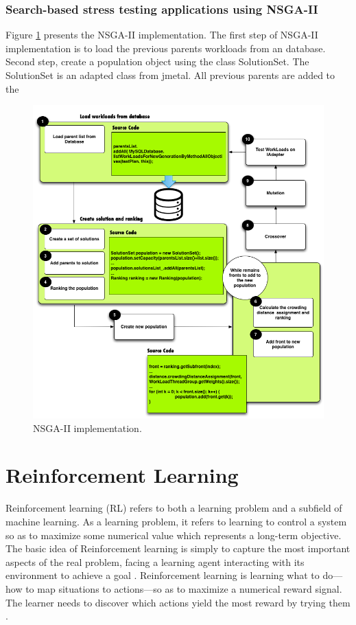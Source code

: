 \documentclass{report}
\begin{document}
\subsection{Search-based stress testing applications using NSGA-II }

Figure \ref{fig:nsga2impl} presents the NSGA-II implementation. The first step of NSGA-II implementation is to load the previous parents workloads from an database. Second step, create a population object using the class SolutionSet. The SolutionSet is an adapted class from jmetal.  All previous parents are added to the 



\begin{figure}[h]

\centering
\includegraphics[width=1\textwidth]{./images/NSGA-ii.png}
\caption{NSGA-II implementation.}
\label{fig:nsga2impl}

\end{figure} 


\chapter{Reinforcement Learning}

Reinforcement learning (RL) refers to both a learning problem and a subfield of machine learning. As a learning problem, it refers to learning to control a system so as to maximize some numerical value which represents a long-term objective. The basic idea of Reinforcement learning  is simply to capture the most important aspects of the real problem, facing a learning agent interacting with its environment to achieve a goal \cite{Sutton2012}. Reinforcement learning is learning what to do—how to map situations to actions—so as to maximize a numerical reward signal. The learner needs to discover which actions yield the most reward by trying them \cite{Sutton2012}.
\end{document}
